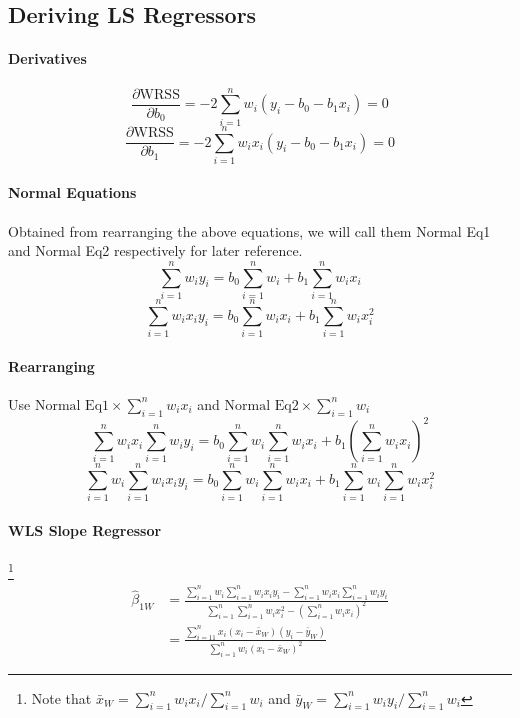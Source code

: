\documentclass[11pt]{article}
\begin{document}
\subsection{Deriving LS Regressors}
\paragraph{Derivatives}
\begin{equation}
    \frac{\partial \mathrm{WRSS}}{\partial b_{0}}=-2 \sum_{i=1}^{n} w_{i}\left(y_{i}-b_{0}-b_{1} x_{i}\right)=0
\end{equation}
\begin{equation}
    \frac{\partial \mathrm{WRSS}}{\partial b_{1}}=-2 \sum_{i=1}^{n} w_{i} x_{i}\left(y_{i}-b_{0}-b_{1} x_{i}\right)=0
\end{equation}
\paragraph{Normal Equations} Obtained from rearranging the above equations, we will call them Normal Eq1 and Normal Eq2 respectively for later reference.
\begin{equation}
    \sum_{i=1}^{n} w_{i} y_{i}=b_{0} \sum_{i=1}^{n} w_{i}+b_{1} \sum_{i=1}^{n} w_{i} x_{i}
\end{equation}
\begin{equation}
    \sum_{i=1}^{n} w_{i} x_{i} y_{i}=b_{0} \sum_{i=1}^{n} w_{i} x_{i}+b_{1} \sum_{i=1}^{n} w_{i} x_{i}^{2}
\end{equation}
\paragraph{Rearranging} Use $\text{Normal Eq1} \times\sum_{i=1}^{n} w_{i} x_{i}$ and $\text{Normal Eq2}\times\sum_{i=1}^{n} w_{i}$
\begin{equation}
    \sum_{i=1}^{n} w_{i} x_{i} \sum_{i=1}^{n} w_{i} y_{i}=b_{0} \sum_{i=1}^{n} w_{i} \sum_{i=1}^{n} w_{i} x_{i}+b_{1}\left(\sum_{i=1}^{n} w_{i} x_{i}\right)^{2}
\end{equation}
\begin{equation}
    \sum_{i=1}^{n} w_{i} \sum_{i=1}^{n} w_{i} x_{i} y_{i}=b_{0} \sum_{i=1}^{n} w_{i} \sum_{i=1}^{n} w_{i} x_{i}+b_{1} \sum_{i=1}^{n} w_{i} \sum_{i=1}^{n} w_{i} x_{i}^{2}
\end{equation}
\paragraph{WLS Slope Regressor} \footnote{Note that $\bar{x}_{W}=\sum_{i=1}^{n} w_{i} x_{i} / \sum_{i=1}^{n} w_{i}$ and $\bar{y}_{W}=\sum_{i=1}^{n} w_{i} y_{i} / \sum_{i=1}^{n} w_{i}$}
\begin{align}
    \hat{\beta}_{1W} &= \frac{\sum_{i=1}^{n} w_{i} \sum_{i=1}^{n} w_{i} x_{i} y_{i}-\sum_{i=1}^{n} w_{i} x_{i} \sum_{i=1}^{n} w_{i} y_{i}}{\sum_{i=1}^{n} \sum_{i=1}^{n} w_{i} x_{i}^{2}-\left(\sum_{i=1}^{n} w_{i} x_{i}\right)^{2}} \\
    &= \frac{\sum_{i=11}^{n} x_{i}\left(x_{i}-\bar{x}_{W}\right)\left(y_{i}-\bar{y}_{W}\right)}{\sum_{i=1}^{n} w_{i}\left(x_{i}-\bar{x}_{W}\right)^{2}}
\end{align}
\end{document}
